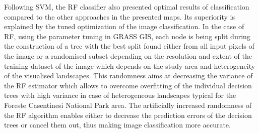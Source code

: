 \documentclass[preprint,12pt,authoryear]{elsarticle}
\begin{document}
Following SVM, the RF classifier also presented optimal results of classification compared to the other approaches in the presented maps. Its superiority is explained by the tuned optimization of the image classification. In the case of RF, using the parameter tuning in GRASS GIS, each node is being split during the construction of a tree with the best split found either from all input pixels of the image or a randomised subset depending on the resolution and extent of the training dataset of the image which depends on the study area and heterogeneity of the visualised landscapes. This randomness aims at decreasing the variance of the RF estimator which allows to overcome overfitting of the individual decision trees with high variance in case of heterogeneous landscapes typical for the Foreste Casentinesi National Park area. The artificially increased randomness of the RF algorithm enables either to decrease the prediction errors of the decision trees or cancel them out, thus making image classification more accurate. 
\end{document}
